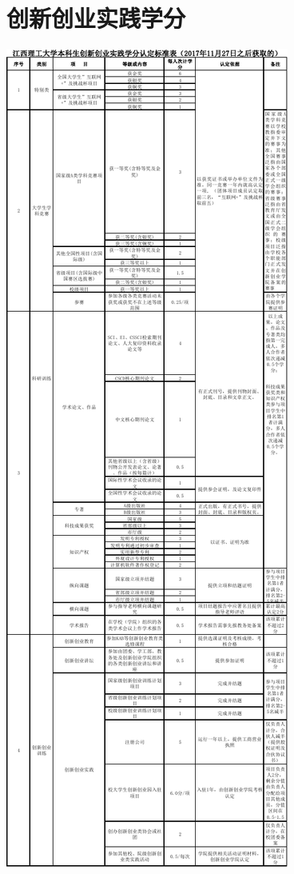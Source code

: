 \documentclass[UTF8]{ctexart}
\theoremstyle{nonumberplain}
\theoremstyle{nonumberplain}
\begin{document}
    \section{创新创业实践学分}\label{fl:2}
    \begin{center}
        \includegraphics[height=0.8\textheight]{cxcy}
    \end{center}

\label{LastPage}
\end{document}
